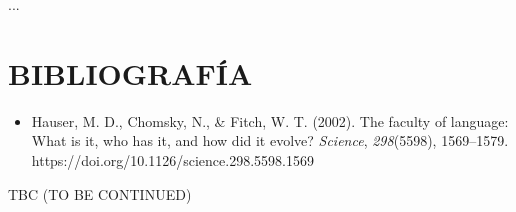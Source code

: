 \documentclass[12pt]{article}
\begin{document}
... 


\section{BIBLIOGRAFÍA}
\begin{itemize}
  \item Hauser, M. D., Chomsky, N., \& Fitch, W. T. (2002). The faculty of language: What is it, who has it, and how did it evolve? \textit{Science}, \textit{298}(5598), 1569--1579. https://doi.org/10.1126/science.298.5598.1569
\end{itemize}

TBC (TO BE CONTINUED) 
\end{document}
